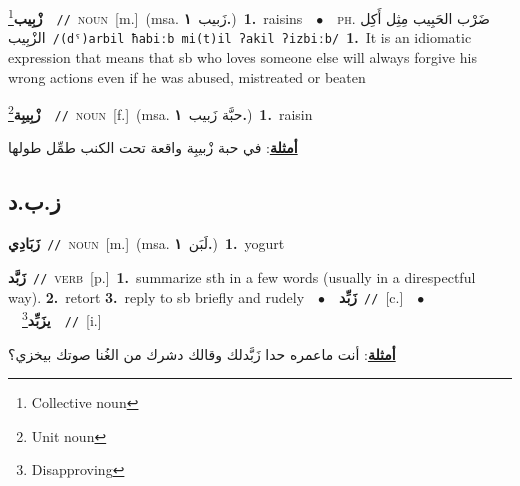 \documentclass[10pt,a4paper,twoside]{article} %
\begin{document}
\begin{multicols}{2}
{\setlength\topsep{0pt}\textbf{\foreignlanguage{arabic}{زْبِيب}}\footnote{Collective noun}\ \ {\color{gray}\texttt{//}\color{black}}\ \textsc{noun}\ [m.]\ \color{gray}(msa. \foreignlanguage{arabic}{زَبيب}~\foreignlanguage{arabic}{\textbf{١.}})\color{black}\ \textbf{1.}~raisins\ \ $\bullet$\ \ \textsc{ph.} \color{gray} \foreignlanguage{arabic}{ضَرْب الحَبِيب مِثِل أَكِل الزْبِيب}\color{black}\ {\color{gray}\texttt{/{\sffamily (dˤ)arbil ħabiːb mi(t)il ʔakil ʔizbiːb}/}\color{black}}\ \textbf{1.}~It is an idiomatic expression that means that sb who loves someone else will always forgive his wrong actions even if he was abused, mistreated or beaten\ } \vspace{2mm}

{\setlength\topsep{0pt}\textbf{\foreignlanguage{arabic}{زْبِيبِة}}\footnote{Unit noun}\ \ {\color{gray}\texttt{//}\color{black}}\ \textsc{noun}\ [f.]\ \color{gray}(msa. \foreignlanguage{arabic}{حبَّة زَبيب}~\foreignlanguage{arabic}{\textbf{١.}})\color{black}\ \textbf{1.}~raisin\  \begin{flushright}\color{gray}\foreignlanguage{arabic}{\textbf{\underline{\foreignlanguage{arabic}{أمثلة}}}: في حبة زْبيبِة واقعة تحت الكنب طمِّل طولها}\end{flushright}\color{black}} \vspace{2mm}

\vspace{-3mm}
\subsection*{\color{blue}\foreignlanguage{arabic}{ز.ب.د}\color{blue}{}} 

{\setlength\topsep{0pt}\textbf{\foreignlanguage{arabic}{زَبَادِي}}\ {\color{gray}\texttt{//}\color{black}}\ \textsc{noun}\ [m.]\ \color{gray}(msa. \foreignlanguage{arabic}{لَبَن}~\foreignlanguage{arabic}{\textbf{١.}})\color{black}\ \textbf{1.}~yogurt\ } \vspace{2mm}

{\setlength\topsep{0pt}\textbf{\foreignlanguage{arabic}{زَبَّد}}\ {\color{gray}\texttt{//}\color{black}}\ \textsc{verb}\ [p.]\ \textbf{1.}~summarize sth in a few words (usually in a direspectful way).  \textbf{2.}~retort  \textbf{3.}~reply to sb briefly and rudely\ \ $\bullet$\ \ \setlength\topsep{0pt}\textbf{\foreignlanguage{arabic}{زَبِّد}}\ {\color{gray}\texttt{//}\color{black}}\ [c.]\ \ $\bullet$\ \ \setlength\topsep{0pt}\textbf{\foreignlanguage{arabic}{يزَبِّد}}\footnote{Disapproving}\ \ {\color{gray}\texttt{//}\color{black}}\ [i.]\  \begin{flushright}\color{gray}\foreignlanguage{arabic}{\textbf{\underline{\foreignlanguage{arabic}{أمثلة}}}: أنت ماعمره حدا زَبَّدلك وقالك دشرك من الغُنا صوتك بيخزي؟}\end{flushright}\color{black}} \vspace{2mm}


\end{multicols}
\end{document}
